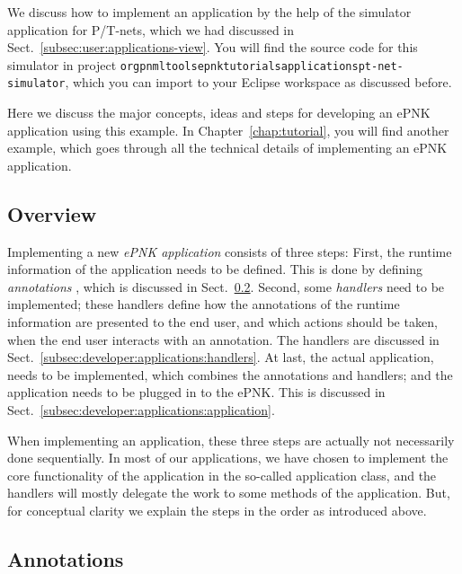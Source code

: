 We discuss how to implement an application by the help of the
simulator application for P/T-nets, which we had discussed in
Sect.~\ref{subsec:user:applications-view}.  You will find the
source code for this simulator in project
{\tt org\qnsep{}pnml\qnsep{}tools\qnsep{}epnk\qnsep{}tutorials\qnsep{}applications\qnsep{}pt-net-simulator},
which you can import to your Eclipse workspace as discussed before.

Here we discuss the major concepts, ideas and steps for developing an
ePNK application using this example. In Chapter~\ref{chap:tutorial},
you will find another example, which goes through all the technical
details of implementing an ePNK application.

\subsection{Overview}
\label{subsec:developer:applications:overview}

Implementing a new \emph{ePNK application} consists of three steps: First,
the runtime information of the application needs to be defined. This is
done by defining \emph{annotations}%
, which is discussed in
Sect.~\ref{subsec:developer:applications:annotations}. Second, some \emph{handlers}
need to be implemented; these handlers define how the annotations of the
runtime information are presented to the end user, and which actions should
be taken, when the end user interacts with an annotation. The handlers
are discussed in Sect.~\ref{subsec:developer:applications:handlers}. 
At last, the actual application, needs to be implemented, which combines
the annotations and handlers; and the application needs to be plugged in
to the ePNK. This is discussed in
Sect.~\ref{subsec:developer:applications:application}. 

When implementing an application, these three steps are actually not necessarily
done sequentially. In most of our applications, we have chosen to implement
the core functionality of the application in the so-called application
class, and the handlers will mostly delegate the work to some methods
of the application. But, for conceptual clarity we explain the steps
in the order as introduced above.

\subsection{Annotations}
\label{subsec:developer:applications:annotations}

